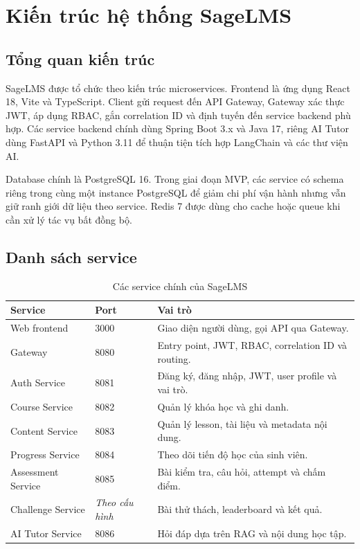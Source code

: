 \chapter{Kiến trúc hệ thống SageLMS}
\label{chap:system-architecture}

\section{Tổng quan kiến trúc}

SageLMS được tổ chức theo kiến trúc microservices. Frontend là ứng dụng React 18, Vite và TypeScript. Client gửi request đến API Gateway, Gateway xác thực JWT, áp dụng RBAC, gắn correlation ID và định tuyến đến service backend phù hợp. Các service backend chính dùng Spring Boot 3.x và Java 17, riêng AI Tutor dùng FastAPI và Python 3.11 để thuận tiện tích hợp LangChain và các thư viện AI.

Database chính là PostgreSQL 16. Trong giai đoạn MVP, các service có schema riêng trong cùng một instance PostgreSQL để giảm chi phí vận hành nhưng vẫn giữ ranh giới dữ liệu theo service. Redis 7 được dùng cho cache hoặc queue khi cần xử lý tác vụ bất đồng bộ.

\label{fig:microservices-architecture}

\section{Danh sách service}

\begin{table}[H]
\centering
\caption{Các service chính của SageLMS}
\label{tab:services}
\begin{tabularx}{\textwidth}{p{}p{}Y}
\toprule
\textbf{Service} & \textbf{Port} & \textbf{Vai trò} \\
\midrule
Web frontend & 3000 & Giao diện người dùng, gọi API qua Gateway. \\
Gateway & 8080 & Entry point, JWT, RBAC, correlation ID và routing. \\
Auth Service & 8081 & Đăng ký, đăng nhập, JWT, user profile và vai trò. \\
Course Service & 8082 & Quản lý khóa học và ghi danh. \\
Content Service & 8083 & Quản lý lesson, tài liệu và metadata nội dung. \\
Progress Service & 8084 & Theo dõi tiến độ học của sinh viên. \\
Assessment Service & 8085 & Bài kiểm tra, câu hỏi, attempt và chấm điểm. \\
Challenge Service & \textit{Theo cấu hình} & Bài thử thách, leaderboard và kết quả. \\
AI Tutor Service & 8086 & Hỏi đáp dựa trên RAG và nội dung học tập. \\
\bottomrule
\end{tabularx}
\end{table}

